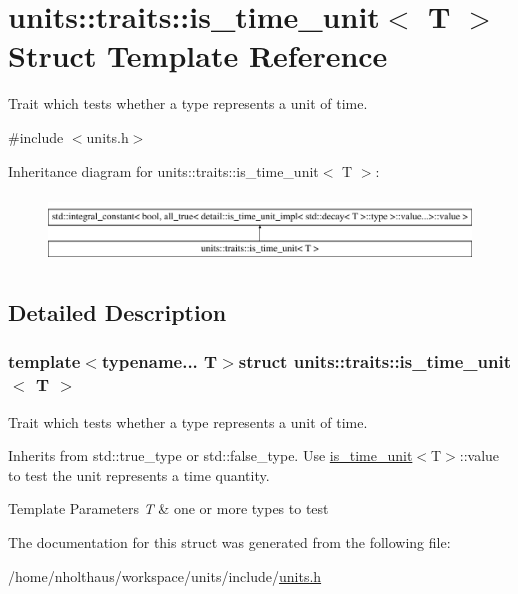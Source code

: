 \hypertarget{structunits_1_1traits_1_1is__time__unit}{}\section{units\+:\+:traits\+:\+:is\+\_\+time\+\_\+unit$<$ T $>$ Struct Template Reference}
\label{structunits_1_1traits_1_1is__time__unit}


Trait which tests whether a type represents a unit of time.  




{\ttfamily \#include $<$units.\+h$>$}

Inheritance diagram for units\+:\+:traits\+:\+:is\+\_\+time\+\_\+unit$<$ T $>$\+:\begin{figure}[H]
\begin{center}
\leavevmode
\includegraphics[height=1.824104cm]{structunits_1_1traits_1_1is__time__unit}
\end{center}
\end{figure}


\subsection{Detailed Description}
\subsubsection*{template$<$typename... T$>$struct units\+::traits\+::is\+\_\+time\+\_\+unit$<$ T $>$}

Trait which tests whether a type represents a unit of time. 

Inherits from {\ttfamily std\+::true\+\_\+type} or {\ttfamily std\+::false\+\_\+type}. Use {\ttfamily \hyperlink{structunits_1_1traits_1_1is__time__unit}{is\+\_\+time\+\_\+unit}$<$T$>$\+::value} to test the unit represents a time quantity. 
\begin{DoxyTemplParams}{Template Parameters}
{\em T} & one or more types to test \\
\hline
\end{DoxyTemplParams}


The documentation for this struct was generated from the following file\+:\begin{DoxyCompactItemize}
\item 
/home/nholthaus/workspace/units/include/\hyperlink{units_8h}{units.\+h}\end{DoxyCompactItemize}
